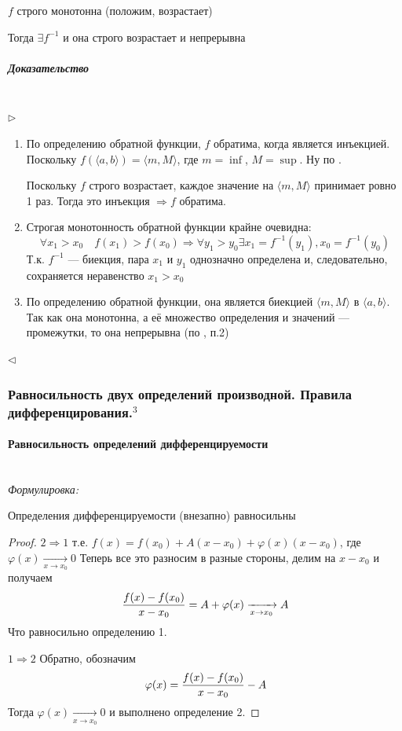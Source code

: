 \documentclass{article}
\let\vanillaparagraph\paragraph
\let\vanillasubparagraph\subparagraph
\renewcommand{\paragraph}[1]{\vanillaparagraph{#1}\mbox{}\\}
\renewcommand{\subparagraph}[1]{\vanillasubparagraph{#1}\mbox{}\\}
\begin{document}
$f$ строго монотонна (положим, возрастает)

Тогда $\exists f^{-1}$ и она строго возрастает и непрерывна

\subparagraph{Доказательство}
$\rhd$
\begin{enumerate}
\item
По определению обратной функции, $f$ обратима, когда является инъекцией. Поскольку $f(\langle a, b \rangle) = \langle m, M \rangle$, где $m = \inf$, $M = \sup$. Ну по .

Поскольку $f$ строго возрастает, каждое значение на $\langle m, M \rangle$ принимает ровно 1 раз. Тогда это инъекция $\Rightarrow f$ обратима.

\item
Строгая монотонность обратной функции крайне очевидна:
$$
\forall x_1 > x_0 \quad f(x_1) > f(x_0) \Rightarrow \forall y_1 > y_0 \exists x_1 = f^{-1}(y_1), x_0 = f^{-1}(y_0)
$$
Т.к. $f^{-1}$ --- биекция, пара $x_1$ и $y_1$ однозначно определена и, следовательно, сохраняется неравенство $x_1 > x_0$

\item
По определению обратной функции, она является биекцией $\langle m, M\rangle$ в $\langle a, b \rangle$. Так как она монотонна, а её множество определения и значений --- промежутки, то она непрерывна (по , п.2) 
\end{enumerate}
$\lhd$

\subsubsection{Равносильность двух определений производной. Правила дифференцирования.\texorpdfstring{$^3$}{}}

\paragraph{Равносильность определений дифференцируемости}

\textit{Формулировка: }

Определения дифференцируемости  (внезапно) равносильны

\begin{proof}
\item{$2 \Rightarrow 1$}
т.е. $f(x) = f(x_0) + A(x-x_0) + \varphi(x)(x-x_0)$, где $\varphi(x) \xrightarrow[x\to x_0]{}0$
Теперь все это разносим в разные стороны, делим на $x - x_0$ и получаем 
\begin{equation}
\frac{f(x) - f(x_0)} {x - x_0} = A + \varphi(x) \xrightarrow[x\to x_0]{} A \notag
\end{equation}
Что равносильно определению 1.
\item {$1 \Rightarrow 2$}
Обратно, обозначим 
\begin{equation}
\varphi(x) = \frac{f(x) - f(x_0)} {x - x_0} - A \notag
\end{equation}
Тогда $\varphi(x) \xrightarrow[x\to x_0]{}0$ и выполнено определение 2.
\end{proof}
\end{document}
